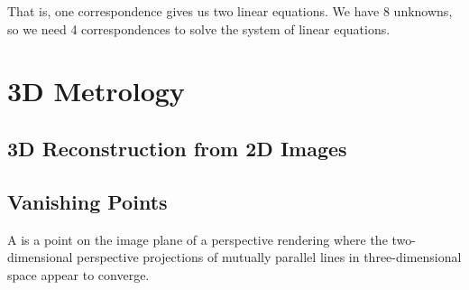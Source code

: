 That is, one correspondence gives us two linear equations. We have 8 unknowns, so we need 4 correspondences to solve the system of linear equations.

\section{3D Metrology}

\subsection{3D Reconstruction from 2D Images}


\subsection{Vanishing Points}

\begin{definition}
    A  is a point on the image plane of a perspective rendering where the two-dimensional perspective projections of mutually parallel lines in three-dimensional space appear to converge. 
\end{definition}

